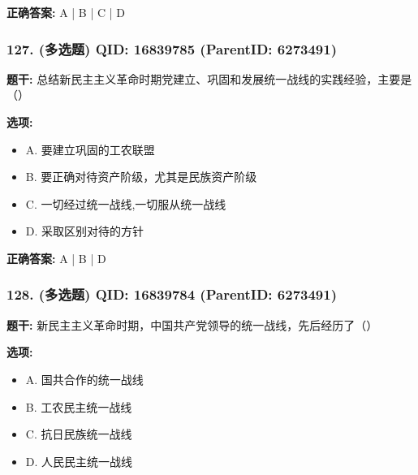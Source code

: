 \documentclass[12pt,UTF8]{ctexart}
\begin{document}
\textbf{正确答案:}
A | B | C | D

\vspace{0.3em}\hrulefill\vspace{0.7em}

\subsubsection*{127. (多选题) \small QID: 16839785 (ParentID: 6273491)}

\textbf{题干:}
总结新民主主义革命时期党建立、巩固和发展统一战线的实践经验，主要是（）



\textbf{选项:}
\begin{itemize}[leftmargin=*]

  \item A. 要建立巩固的工农联盟

  \item B. 要正确对待资产阶级，尤其是民族资产阶级

  \item C. 一切经过统一战线,一切服从统一战线

  \item D. 采取区别对待的方针

\end{itemize}

\textbf{正确答案:}
A | B | D

\vspace{0.3em}\hrulefill\vspace{0.7em}

\subsubsection*{128. (多选题) \small QID: 16839784 (ParentID: 6273491)}

\textbf{题干:}
新民主主义革命时期，中国共产党领导的统一战线，先后经历了（）



\textbf{选项:}
\begin{itemize}[leftmargin=*]

  \item A. 国共合作的统一战线

  \item B. 工农民主统一战线

  \item C. 抗日民族统一战线

  \item D. 人民民主统一战线

\end{itemize}
\end{document}
